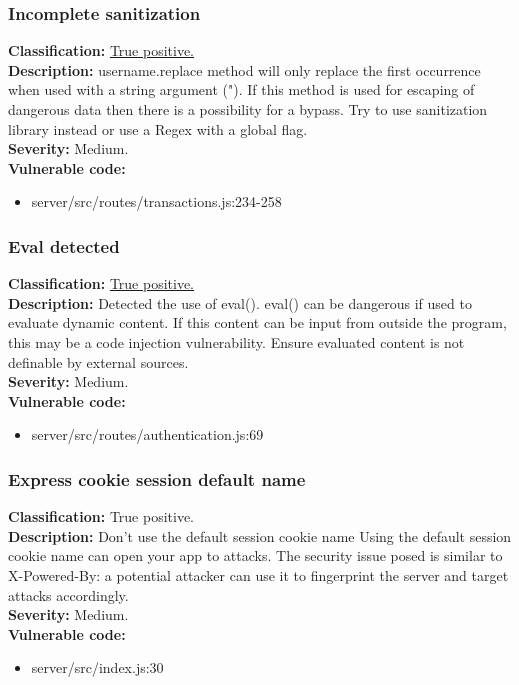 \documentclass[]{article}
\begin{document}
\subsubsection{Incomplete sanitization}
\textbf{Classification:} \hyperref[subsubsec:improper_limitation_of_a_pathname_to_a_restricted_directory]{True positive.} \\ 
\textbf{Description:} username.replace method will only replace the first occurrence when used with a string argument ("). 
If this method is used for escaping of dangerous data then there is a possibility for a bypass. Try to use sanitization 
library instead or use a Regex with a global flag. \\ 
\textbf{Severity:} Medium. \\ 
\textbf{Vulnerable code:} 
\begin{itemize}
    \item server/src/routes/transactions.js:234-258
\end{itemize}

\subsubsection{Eval detected}
\textbf{Classification:} \hyperref[subsubsec:improper_neutralization_of_directives_in_dynamically_evaluated_code]{True positive.} \\ 
\textbf{Description:} Detected the use of eval(). eval() can be dangerous if used to evaluate dynamic content. If this 
content can be input from outside the program, this may be a code injection vulnerability. Ensure evaluated content is 
not definable by external sources. \\ 
\textbf{Severity:} Medium. \\ 
\textbf{Vulnerable code:} 
\begin{itemize}
    \item server/src/routes/authentication.js:69
\end{itemize}

\subsubsection{Express cookie session default name}
\textbf{Classification:} True positive. \\ 
\textbf{Description:} Don't use the default session cookie name Using the default session cookie name can open your 
app to attacks. The security issue posed is similar to X-Powered-By: a potential attacker can use it to fingerprint 
the server and target attacks accordingly. \\ 
\textbf{Severity:} Medium. \\ 
\textbf{Vulnerable code:} 
\begin{itemize}
    \item server/src/index.js:30
\end{itemize}
\end{document}
